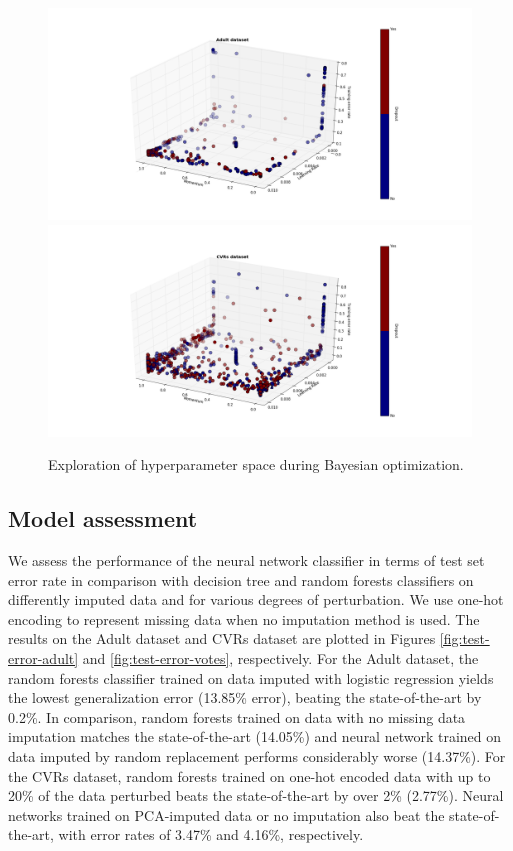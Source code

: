 \documentclass[10pt,twocolumn,letterpaper]{article}
\begin{document}
\begin{figure}[htbp] 
   \begin{center}
   \includegraphics[width=1\textwidth,left]{../images/params3d_adult.png}
    \includegraphics[width=1\textwidth,left]{../images/params3d_votes.png}
   \caption{Exploration of hyperparameter space during Bayesian optimization.}
   \label{fig:params}
      \end{center}
\end{figure}

\subsection{Model assessment}

We assess the performance of the neural network classifier in terms of test set error rate in comparison with decision tree and random forests classifiers on differently imputed data and for various degrees of perturbation.  We use one-hot encoding to represent missing data when no imputation method is used. The results on the Adult dataset and CVRs dataset are plotted in Figures \ref{fig:test-error-adult} and \ref{fig:test-error-votes}, respectively. For the Adult dataset, the random forests classifier trained on data imputed with logistic regression yields the lowest generalization error (13.85\% error), beating the state-of-the-art by 0.2\%. In comparison, random forests trained on data with no missing data imputation matches the state-of-the-art (14.05\%) and neural network trained on data imputed by random replacement performs considerably worse (14.37\%). For the CVRs dataset, random forests trained on one-hot encoded data with up to 20\% of the data perturbed beats the state-of-the-art by over 2\% (2.77\%). Neural networks trained on PCA-imputed data or no imputation also beat the state-of-the-art, with error rates of 3.47\% and 4.16\%, respectively. 
\end{document}
